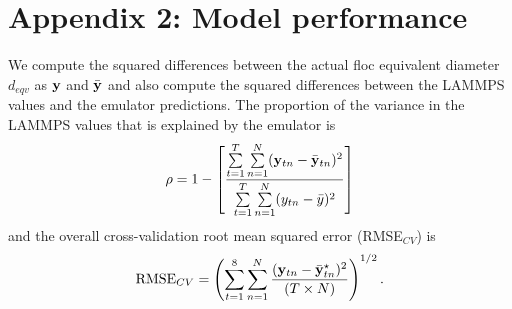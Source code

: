 \newpage

\section*{Appendix 2: Model performance}
We compute the squared differences between the actual floc equivalent diameter $d_{eqv}$ as ${\bf y}$ and $\bar {{\bf y}}$ and also compute the squared differences between the LAMMPS values and the emulator predictions. The proportion of the variance in the LAMMPS values that is explained by the emulator is
\begin{align}\label{gaga4}
\rho=1-\left[\frac{\sum\limits_{t=1}^T\sum\limits_{n=1}^N
({\bf y}_{tn}-\bar {{\bf y}}_{tn})^2}
{\sum\limits_{t=1}^T\sum\limits_{n=1}^N
(y_{tn}-\bar y)^2}\right]
\end{align}
and the overall cross-validation root mean squared error (RMSE$_{CV}$) is
\begin{equation}\label{gaga4b}
\mbox{RMSE}_{CV}= \left(\sum\limits_{t=1}^8\sum\limits_{n=1}^N
\frac{({\bf y}_{tn}-\bar {{\bf y}}_{tn}^{\star})^2}{(T\times N)} \right)^{1/2}.
\end{equation}








%


